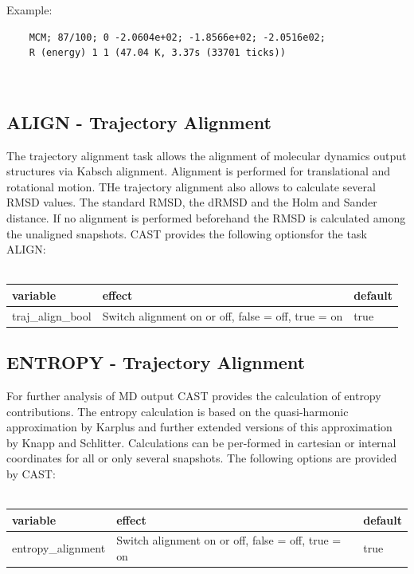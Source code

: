 \documentclass[10pt,a4paper]{article} %
\newif\ifdevmode %
\begin{document}
{	Example:\\
	\begin{lstlisting}
	MCM; 87/100; 0 -2.0604e+02; -1.8566e+02; -2.0516e02;
	R (energy) 1 1 (47.04 K, 3.37s (33701 ticks))
	\end{lstlisting}~\\

	\subsection{ALIGN - Trajectory Alignment}
	 The trajectory alignment task allows the alignment of molecular dynamics output structures via Kabsch alignment. Alignment is performed for translational and rotational motion. THe trajectory alignment also allows to calculate several RMSD values. The standard RMSD, the dRMSD and the Holm and Sander distance. If no alignment is performed beforehand the RMSD is calculated among the unaligned snapshots. CAST provides the following optionsfor the task ALIGN: \\~\\

	\begin{tabularx}{\textwidth}{l|X|X}
		variable & effect & default\\
		\hline
		traj_align_bool & Switch alignment on or off, false = off, true = on & true\\

	\end{tabularx}
	\ifdevmode
	\colorbox{red}{HERE IS STILL WORK TO BE DONE}
	\fi

	\subsection{ENTROPY - Trajectory Alignment}
	For further analysis of MD output CAST provides the calculation of entropy contributions. The entropy calculation is based on the quasi-harmonic approximation by Karplus and further extended versions of this approximation by Knapp and Schlitter. Calculations can be per-formed in cartesian or internal coordinates for all or only several snapshots. The following options are provided by CAST: \\~\\

	\begin{tabularx}{\textwidth}{l|X|X}
		variable & effect & default\\
		\hline
		entropy_alignment & Switch alignment on or off, false = off, true = on & true\\


\end{tabularx}}
\end{document}
